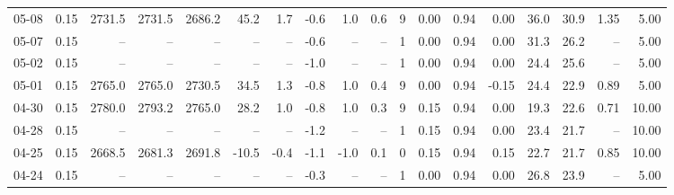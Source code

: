\begin{threeparttable}
{\begin{tabular}{lrrrrrrrrrrrrrrrrr}
  05-08 &     0.15 & 2731.5 & 2731.5 & 2686.2 &       45.2 &            1.7 &                      -0.6 &                      1.0 &                 0.6 &              9 &       0.00 &      0.94 &           0.00 &             36.0 &                30.9 &            1.35 &                   5.00 \\
  05-07 &     0.15 &     -- &     -- &     -- &         -- &             -- &                      -0.6 &                       -- &                  -- &              1 &       0.00 &      0.94 &           0.00 &             31.3 &                26.2 &              -- &                   5.00 \\
  05-02 &     0.15 &     -- &     -- &     -- &         -- &             -- &                      -1.0 &                       -- &                  -- &              1 &       0.00 &      0.94 &           0.00 &             24.4 &                25.6 &              -- &                   5.00 \\
  05-01 &     0.15 & 2765.0 & 2765.0 & 2730.5 &       34.5 &            1.3 &                      -0.8 &                      1.0 &                 0.4 &              9 &       0.00 &      0.94 &          -0.15 &             24.4 &                22.9 &            0.89 &                   5.00 \\
  04-30 &     0.15 & 2780.0 & 2793.2 & 2765.0 &       28.2 &            1.0 &                      -0.8 &                      1.0 &                 0.3 &              9 &       0.15 &      0.94 &           0.00 &             19.3 &                22.6 &            0.71 &                  10.00 \\
  04-28 &     0.15 &     -- &     -- &     -- &         -- &             -- &                      -1.2 &                       -- &                  -- &              1 &       0.15 &      0.94 &           0.00 &             23.4 &                21.7 &              -- &                  10.00 \\
  04-25 &     0.15 & 2668.5 & 2681.3 & 2691.8 &      -10.5 &           -0.4 &                      -1.1 &                     -1.0 &                 0.1 &              0 &       0.15 &      0.94 &           0.15 &             22.7 &                21.7 &            0.85 &                  10.00 \\
  04-24 &     0.15 &     -- &     -- &     -- &         -- &             -- &                      -0.3 &                       -- &                  -- &              1 &       0.00 &      0.94 &           0.00 &             26.8 &                23.9 &              -- &                   5.00 \\

\end{tabular}}
\end{threeparttable}
